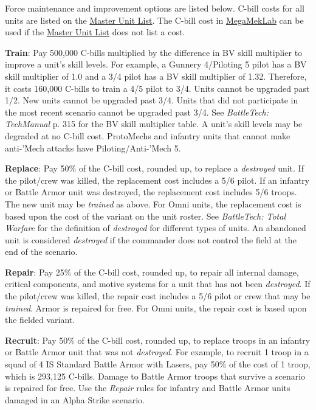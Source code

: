 Force maintenance and improvement options are listed below.
C-bill costs for all units are listed on the \href{http://www.masterunitlist.info}{Master Unit List}.
The C-bill cost in \href{https://megamek.org}{MegaMekLab} can be used if the \href{http://www.masterunitlist.info}{Master Unit List} does not list a cost.

\begin{description}

\item {\bfseries Train}: Pay 500,000 C-bills multiplied by the difference in BV skill multiplier to improve a unit's skill levels.
For example, a Gunnery 4/Piloting 5 pilot has a BV skill multiplier of 1.0 and a 3/4 pilot has a BV skill multiplier of 1.32.
Therefore, it costs 160,000 C-bills to train a 4/5 pilot to 3/4.
Units cannot be upgraded past 1/2.
New units cannot be upgraded past 3/4.
Units that did not participate in the most recent scenario cannot be upgraded past 3/4.
See \emph{BattleTech: TechManual} p. 315 for the BV skill multiplier table.
A unit's skill levels may be degraded at no C-bill cost.
ProtoMechs and infantry units that cannot make anti-'Mech attacks have Piloting/Anti-'Mech 5.

\item {\bfseries Replace}: Pay 50\% of the C-bill cost, rounded up, to replace a \emph{destroyed} unit.
If the pilot/crew was killed, the replacement cost includes a 5/6 pilot.
If an infantry or Battle Armor unit was destroyed, the replacement cost includes 5/6 troops.
The new unit may be \emph{trained} as above.
For Omni units, the replacement cost is based upon the cost of the variant on the unit roster.
See \emph{BattleTech: Total Warfare} for the definition of \emph{destroyed} for different types of units.
An abandoned unit is considered \emph{destroyed} if the commander does not control the field at the end of the scenario.

\item {\bfseries Repair}: Pay 25\% of the C-bill cost, rounded up, to repair all internal damage, critical components, and motive systems for a unit that has not been \emph{destroyed}.
If the pilot/crew was killed, the repair cost includes a 5/6 pilot or crew that may be \emph{trained}.
Armor is repaired for free.
For Omni units, the repair cost is based upon the fielded variant.

\item {\bfseries Recruit}: Pay 50\% of the C-bill cost, rounded up, to replace troops in an infantry or Battle Armor unit that was not \emph{destroyed}.
For example, to recruit 1 troop in a squad of 4 IS Standard Battle Armor with Lasers, pay 50\% of the cost of 1 troop, which is 293,125 C-bills.
Damage to Battle Armor troops that survive a scenario is repaired for free.
Use the \emph{Repair} rules for infantry and Battle Armor units damaged in an Alpha Strike scenario.


\end{description}
